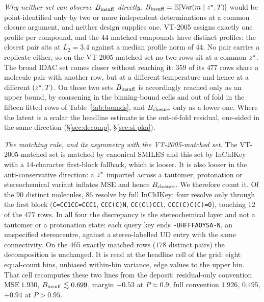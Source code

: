 \emph{Why neither set can observe $B_{\mathrm{insuff}}$ directly.} $B_{\mathrm{insuff}}=\mathbb{E}[\mathrm{Var}(m\mid z^\star,T)]$ would be
point-identified only by two or more independent determinations at a common closure argument, and
neither design supplies one. VT-2005 assigns exactly one profile per compound, and the $44$ matched compounds have distinct
profiles: the closest pair sits at $L_2{=}3.4$ against a median profile norm of $44$. No pair
carries a replicate either, so on the VT-2005-matched set no two rows sit at a common $z^\star$. The broad
IDAC set comes closer without reaching it: $359$ of its $477$ rows share a molecule pair with another
row, but at a different temperature and hence at a different $(z^\star,T)$. On these two sets $B_{\mathrm{insuff}}$ is accordingly reached only as an upper bound, by coarsening in the
binning-bound cells and out of fold in the fifteen fitted rows of Table~\ref{tab:bounds}, and
$B_{\mathrm{closure}}$ only as a lower one. Where the latent is a scalar the headline estimate is the out-of-fold
residual, one-sided in the same direction (\S\ref{sec:decomp}, \S\ref{sec:si-pka}).

\emph{The matching rule, and its asymmetry with the VT-2005-matched set.} The VT-2005-matched set is matched by canonical SMILES and this set by InChIKey with a
$14$-character first-block fallback, which is looser. It is also looser in the anti-conservative
direction: a $z^\star$ imported across a tautomer, protonation or stereochemical variant inflates
$\mathrm{MSE}$ and hence $B_{\mathrm{closure}}$. We therefore count it. Of the $90$
distinct molecules, $86$ resolve by full InChIKey; four resolve only through the first block
(\texttt{C=CC1CC=CCC1}, \texttt{CCC(C)N}, \texttt{CC(Cl)CCl}, \texttt{CCC(C)C(C)=O}), touching $12$
of the $477$ rows. In all four the discrepancy is the stereochemical layer and not a tautomer or a
protonation state: each query key ends \texttt{-UHFFFAOYSA-N}, an unspecified stereocentre, against a
stereo-labelled UD entry with the same connectivity. On the $465$ exactly matched rows ($178$ distinct pairs) the decomposition is unchanged. It is
read at the headline cell of the grid: eight equal-count bins, unbiased within-bin variance, edge
values to the upper bin. That cell recomputes these two lines from the deposit:
residual-only convention $\mathrm{MSE}\ 1.930$, $B_{\mathrm{insuff}}\lesssim0.699$, margin $+0.53$ at $P\approx0.9$;
full convention $1.926$, $0.495$, $+0.94$ at $P>0.95$.


